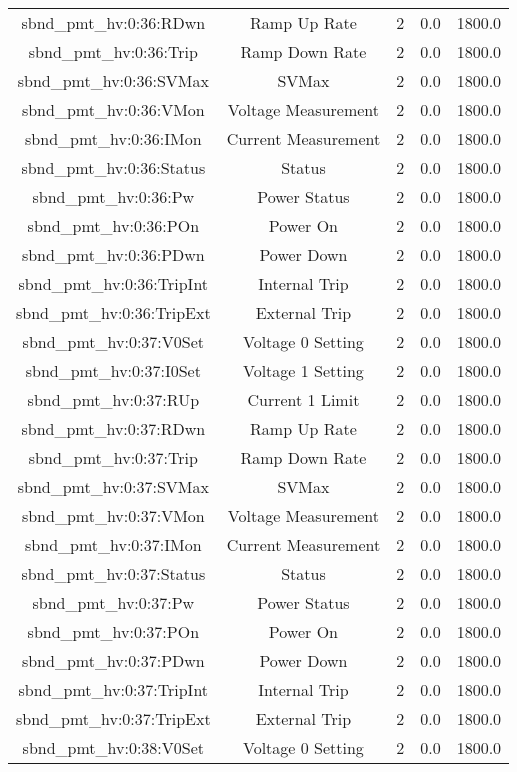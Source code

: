 \begin{table}[ptb]
\begin{tabular}{c | c c c c}
sbnd_pmt_hv:0:36:RDwn & Ramp Up Rate & 2 & 0.0 & 1800.0\\ 
sbnd_pmt_hv:0:36:Trip & Ramp Down Rate & 2 & 0.0 & 1800.0\\ 
sbnd_pmt_hv:0:36:SVMax & SVMax & 2 & 0.0 & 1800.0\\ 
sbnd_pmt_hv:0:36:VMon & Voltage Measurement & 2 & 0.0 & 1800.0\\ 
sbnd_pmt_hv:0:36:IMon & Current Measurement & 2 & 0.0 & 1800.0\\ 
sbnd_pmt_hv:0:36:Status & Status & 2 & 0.0 & 1800.0\\ 
sbnd_pmt_hv:0:36:Pw & Power Status & 2 & 0.0 & 1800.0\\ 
sbnd_pmt_hv:0:36:POn & Power On & 2 & 0.0 & 1800.0\\ 
sbnd_pmt_hv:0:36:PDwn & Power Down & 2 & 0.0 & 1800.0\\ 
sbnd_pmt_hv:0:36:TripInt & Internal Trip & 2 & 0.0 & 1800.0\\ 
sbnd_pmt_hv:0:36:TripExt & External Trip & 2 & 0.0 & 1800.0\\ 
sbnd_pmt_hv:0:37:V0Set & Voltage 0 Setting & 2 & 0.0 & 1800.0\\ 
sbnd_pmt_hv:0:37:I0Set & Voltage 1 Setting & 2 & 0.0 & 1800.0\\ 
sbnd_pmt_hv:0:37:RUp & Current 1 Limit & 2 & 0.0 & 1800.0\\ 
sbnd_pmt_hv:0:37:RDwn & Ramp Up Rate & 2 & 0.0 & 1800.0\\ 
sbnd_pmt_hv:0:37:Trip & Ramp Down Rate & 2 & 0.0 & 1800.0\\ 
sbnd_pmt_hv:0:37:SVMax & SVMax & 2 & 0.0 & 1800.0\\ 
sbnd_pmt_hv:0:37:VMon & Voltage Measurement & 2 & 0.0 & 1800.0\\ 
sbnd_pmt_hv:0:37:IMon & Current Measurement & 2 & 0.0 & 1800.0\\ 
sbnd_pmt_hv:0:37:Status & Status & 2 & 0.0 & 1800.0\\ 
sbnd_pmt_hv:0:37:Pw & Power Status & 2 & 0.0 & 1800.0\\ 
sbnd_pmt_hv:0:37:POn & Power On & 2 & 0.0 & 1800.0\\ 
sbnd_pmt_hv:0:37:PDwn & Power Down & 2 & 0.0 & 1800.0\\ 
sbnd_pmt_hv:0:37:TripInt & Internal Trip & 2 & 0.0 & 1800.0\\ 
sbnd_pmt_hv:0:37:TripExt & External Trip & 2 & 0.0 & 1800.0\\ 
sbnd_pmt_hv:0:38:V0Set & Voltage 0 Setting & 2 & 0.0 & 1800.0\\ 

\end{tabular}
\end{table}

